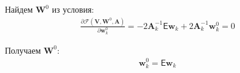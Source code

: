 \documentclass[12pt, twoside]{article}
\numberwithin{equation}{section}
\begin{document}
Найдем $\textbf{W}^{0}$ из условия:
\begin{equation}
\label{eq:st:lin:10}
\begin{aligned}
\frac{\partial \mathcal{F}\left(\textbf{V}, \textbf{W}^{0}, \textbf{A}\right)}{\partial \textbf{w}_{k}^{0}} = -2\textbf{A}_{k}^{-1}\mathsf{E}\textbf{w}_{k} + 2\textbf{A}_{k}^{-1}\textbf{w}_{k}^{0}=0
\end{aligned}
\end{equation}

Получаем $\textbf{W}^{0}$:
\begin{equation}
\label{eq:st:lin:11}
\begin{aligned}
\textbf{w}_{k}^{0} = \mathsf{E}\textbf{w}_{k}
\end{aligned}
\end{equation}
\end{document}
